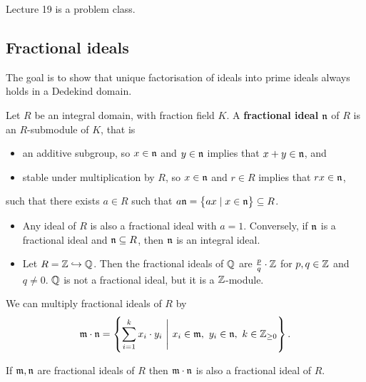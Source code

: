 
Lecture 19 is a problem class.

\pagebreak

\subsection{Fractional ideals}


The goal is to show that unique factorisation of ideals into prime ideals always holds in a Dedekind domain.

\begin{definition}
Let $ R $ be an integral domain, with fraction field $ K $. A \textbf{fractional ideal} $ \mathfrak{n} $ of $ R $ is an $ R $-submodule of $ K $, that is
\begin{itemize}
\item an additive subgroup, so $ x \in \mathfrak{n} $ and $ y \in \mathfrak{n} $ implies that $ x + y \in \mathfrak{n} $, and
\item stable under multiplication by $ R $, so $ x \in \mathfrak{n} $ and $ r \in R $ implies that $ rx \in \mathfrak{n} $,
\end{itemize}
such that there exists $ a \in R $ such that $ a\nn = \cbr{ax \mid x \in \nn} \subseteq R $.
\end{definition}

\begin{example*}
\hfill
\begin{itemize}
\item Any ideal of $ R $ is also a fractional ideal with $ a = 1 $. Conversely, if $ \mathfrak{n} $ is a fractional ideal and $ \mathfrak{n} \subseteq R $, then $ \mathfrak{n} $ is an integral ideal.
\item Let $ R = \mathbb{Z} \hookrightarrow \mathbb{Q} $. Then the fractional ideals of $ \mathbb{Q} $ are $ \tfrac{p}{q} \cdot \mathbb{Z} $ for $ p, q \in \mathbb{Z} $ and $ q \ne 0 $. $ \mathbb{Q} $ is not a fractional ideal, but it is a $ \mathbb{Z} $-module.
\end{itemize}
\end{example*}

We can multiply fractional ideals of $ R $ by
$$ \mm \cdot \nn = \cbr{\sum_{i = 1}^k x_i \cdot y_i \ \Bigg| \ x_i \in \mm, \ y_i \in \nn, \ k \in \Z_{\ge 0}}. $$

\begin{lemma}
If $ \mathfrak{m}, \mathfrak{n} $ are fractional ideals of $ R $ then $ \mathfrak{m} \cdot \mathfrak{n} $ is also a fractional ideal of $ R $.
\end{lemma}

